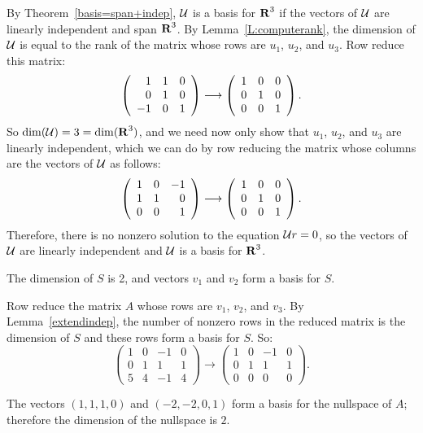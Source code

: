 \documentclass{ximera}
\begin{document}
By Theorem~\ref{basis=span+indep},
${\cal U}$ is a basis for $\mbox{$\bf{R}$}^3$ if the vectors of ${\cal U}$ are
linearly independent and span $\mbox{$\bf{R}$}^3$.  By Lemma~\ref{L:computerank},
the dimension of ${\cal U}$ is equal to the rank of the matrix whose
rows are $u_1$, $u_2$, and $u_3$.  Row reduce this matrix:
\[
\left(\begin{array}{rrr} 1 & 1 & 0 \\ 0 & 1 & 0 \\ -1 & 0 & 1\end{array}\right) \longrightarrow
\left(\begin{array}{rrr} 1 & 0 & 0 \\ 0 & 1 & 0 \\ 0 & 0 & 1\end{array}\right).
\]
So $\dim({\cal U}) = 3 = \dim(\mbox{$\bf{R}$}^3)$, and we need now only show that
$u_1$, $u_2$, and $u_3$ are linearly independent, which we can do by
row reducing the matrix whose columns are the vectors of ${\cal U}$ as
follows:
\[
\left(\begin{array}{rrr} 1 & 0 & -1 \\ 1 & 1 & 0 \\ 0 & 0 & 1\end{array}\right) \longrightarrow
\left(\begin{array}{rrr} 1 & 0 & 0 \\ 0 & 1 & 0 \\ 0 & 0 & 1\end{array}\right).
\]
Therefore, there is no nonzero solution to the equation
${\cal U}r = 0$, so the vectors of ${\cal U}$ are linearly independent
and ${\cal U}$ is a basis for $\mbox{$\bf{R}$}^3$.

\ans The dimension of $S$ is 2, and vectors $v_1$ and $v_2$ form a
basis for $S$.

\soln Row reduce the matrix $A$ whose rows are $v_1$, $v_2$, and $v_3$. 
By Lemma~\ref{extendindep}, the number
of nonzero rows in the reduced matrix is the dimension of $S$ and these
rows form a basis for $S$.  So:
\[
\left(\begin{array}{rrrr} 1 & 0 & -1 & 0 \\ 0 & 1 & 1 & 1 \\ 5
& 4 & -1 & 4 \end{array}\right) \longrightarrow \left(\begin{array}
{rrrr} 1& 0 & -1 & 0 \\ 0 & 1 & 1 & 1 \\ 0 & 0 & 0 & 0
\end{array}\right).
\]

\ans The vectors $(1,1,1,0)$ and $(-2,-2,0,1)$ form a basis for the
nullspace of $A$; therefore the dimension of the nullspace is $2$.
\end{document}
